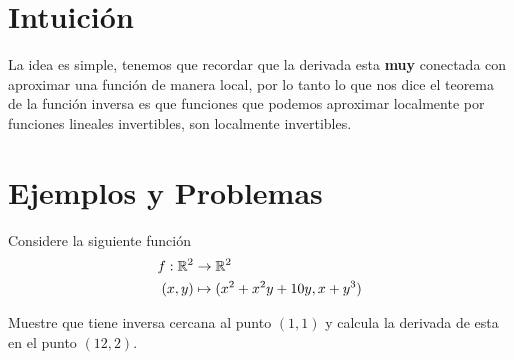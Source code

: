 \documentclass[a4paper,oneside,10.5pt]{article}
\begin{document}
\section*{Intuición}
La idea es simple, tenemos que recordar que la derivada esta \textbf{muy} conectada con aproximar una función de manera local, por lo tanto lo que nos dice el teorema de la función inversa es que funciones que podemos aproximar localmente por funciones lineales invertibles, son localmente invertibles.

\section*{Ejemplos y Problemas}
\begin{prob}
Considere la siguiente función
\begin{align*}
    f : \mathbb{R}^2 &\to \mathbb{R}^2\\
    (x, y) &\mapsto (x^2 + x^2y + 10y, x + y^3)
\end{align*}

Muestre que tiene inversa cercana al punto $(1,1)$ y calcula la derivada de esta en el punto $(12, 2)$.
\end{prob}
\end{document}
